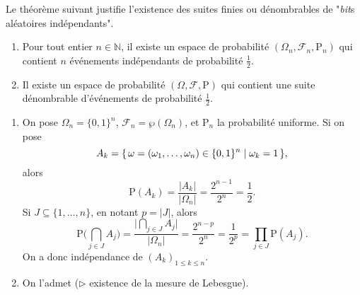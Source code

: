 \documentclass[./main]{subfiles}
\begin{document}
  Le théorème suivant justifie l'existence des suites finies ou dénombrables de "\textit{bit}s aléatoires indépendants".

  \begin{thm}
    \begin{enumerate}
      \item Pour tout entier $n \in \mathds{N}$, il existe un espace de probabilité $(\Omega_n, \mathcal{F}_n, \mathrm{P}_n)$ qui contient $n$ événements indépendants de probabilité $\frac{1}{2}$.
      \item Il existe un espace de probabilité $(\Omega, \mathcal{F}, \mathrm{P})$ qui contient une suite dénombrable d'événements de probabilité $\frac{1}{2}$.
    \end{enumerate}
  \end{thm}
  \begin{prv}
    \begin{enumerate}
      \item On pose $\Omega_n = \{0,1\}^n$, $\mathcal{F}_n = \wp(\Omega_n)$, et $\mathrm{P}_n$ la probabilité uniforme.
        Si on pose \[
        A_k = \mleft\{\,\omega = (\omega_1, \ldots, \omega_n) \in \{0,1\}^n \;\middle|\; \omega_k = 1\,\mright\} 
        ,\]
        alors \[
        \mathrm{P}(A_k) = \frac{|A_k|}{|\Omega_n|} = \frac{2^{n-1}}{2^{n}} = \frac{1}{2}
        .\]
        Si $J \subseteq \{1, \ldots, n\}$, en notant $p = |J|$, alors 
         \[
        \mathrm{P}\Big(\bigcap_{j \in J} A_j\Big) = \frac{\Big|\bigcap_{j \in J} A_j\Big|}{|\Omega_n|} = \frac{2^{n-p}}{2^n} = \frac{1}{2^p}  = \prod_{j \in J} \mathrm{P}(A_j)
        .\]
        On a donc indépendance de $(A_k)_{1 \le k \le n}$.
      \item On l'admet ($\triangleright$ existence de la mesure de Lebesgue).
    \end{enumerate}
  \end{prv}
\end{document}
